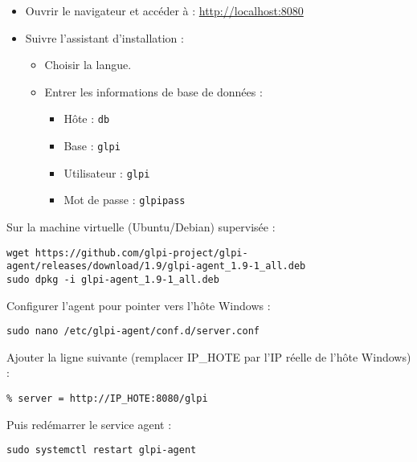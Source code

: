\documentclass[11pt,a4paper]{article}
\begin{document}
\begin{tcolorbox}[title={4. Accéder à GLPI}]
\begin{itemize}
  \item Ouvrir le navigateur et accéder à : \url{http://localhost:8080}  
  \item Suivre l’assistant d’installation :  
  \begin{itemize}
    \item Choisir la langue.  
    \item Entrer les informations de base de données :  
      \begin{itemize}
        \item Hôte : \texttt{db}  
        \item Base : \texttt{glpi}  
        \item Utilisateur : \texttt{glpi}  
        \item Mot de passe : \texttt{glpipass}  
      \end{itemize}
  \end{itemize}
\end{itemize}
\end{tcolorbox}

\begin{tcolorbox}[title={5. Installer l’agent GLPI sur la VM Linux}]
Sur la machine virtuelle (Ubuntu/Debian) supervisée :  

\begin{verbatim}
wget https://github.com/glpi-project/glpi-agent/releases/download/1.9/glpi-agent_1.9-1_all.deb
sudo dpkg -i glpi-agent_1.9-1_all.deb
\end{verbatim}

Configurer l’agent pour pointer vers l’hôte Windows :  

\begin{verbatim}
sudo nano /etc/glpi-agent/conf.d/server.conf
\end{verbatim}

Ajouter la ligne suivante (remplacer IP\_HOTE par l’IP réelle de l’hôte Windows) :  

\begin{verbatim}
% server = http://IP_HOTE:8080/glpi
\end{verbatim}

Puis redémarrer le service agent :  
\begin{verbatim}
sudo systemctl restart glpi-agent
\end{verbatim}
\end{tcolorbox}
\end{document}
